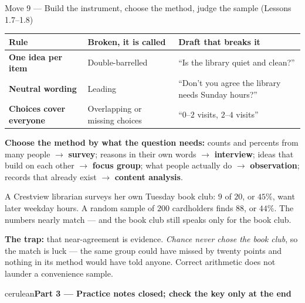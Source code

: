 \documentclass[10pt]{article}
\newcommand{\parthead}[1]{%
  \vspace{6pt}\noindent
  \begin{headlinebox}{cerulean}{\color{white}\bfseries #1}\end{headlinebox}%
  \vspace{4pt}}
\begin{document}
\vspace{3pt}
\boxguard[18]
\begin{notesbox}{Move 9 --- Build the instrument, choose the method, judge the sample (Lessons 1.7--1.8)}
\small
\renewcommand{\arraystretch}{1.2}
\begin{tabularx}{\linewidth}{@{} >{\bfseries}p{2.6cm} X X @{}}
\rowcolor{frost}
\textbf{Rule} & \textbf{Broken, it is called} & \textbf{Draft that breaks it} \\
\midrule
One idea per item & Double-barrelled & ``Is the library quiet and clean?'' \\
Neutral wording & Leading & ``Don't you agree the library needs Sunday hours?'' \\
Choices cover everyone & Overlapping or missing choices & ``$0$--$2$ visits, $2$--$4$
  visits'' \\
\end{tabularx}

\vspace{3pt}
\textbf{Choose the method by what the question needs:} counts and percents from many people
$\rightarrow$ \textbf{survey}; reasons in their own words $\rightarrow$ \textbf{interview};
ideas that build on each other $\rightarrow$ \textbf{focus group}; what people actually do
$\rightarrow$ \textbf{observation}; records that already exist $\rightarrow$ \textbf{content
analysis}.

\vspace{3pt}
A Crestview librarian surveys her own Tuesday book club: $9$ of $20$, or $45\%$, want later
weekday hours. A random sample of $200$ cardholders finds $88$, or $44\%$. The numbers nearly
match --- and the book club still speaks only for the book club.

\vspace{2pt}
\textbf{The trap:} that near-agreement is evidence. \emph{Chance never chose the book club}, so
the match is luck --- the same group could have missed by twenty points and nothing in its
method would have told anyone. Correct arithmetic does not launder a convenience sample.
\end{notesbox}
\normalsize

\boxguard[22]
\parthead{Part 3 --- Practice \hfill notes closed; check the key only at the end}
\end{document}
